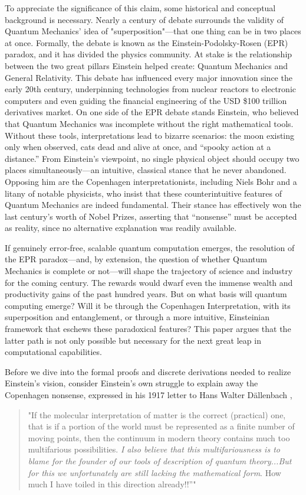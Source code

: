 \documentclass{article}
\begin{document}
To appreciate the significance of this claim, some historical and conceptual background is necessary. Nearly a century of debate surrounds the validity of Quantum Mechanics' idea of "superposition"—that one thing can be in two places at once. Formally, the debate is known as the Einstein-Podolsky-Rosen (EPR)\cite{EPR1935} paradox, and it has divided the physics community. At stake is the relationship between the two great pillars Einstein helped create: Quantum Mechanics and General Relativity. This debate has influenced every major innovation since the early 20th century, underpinning technologies from nuclear reactors to electronic computers and even guiding the financial engineering of the USD \$100 trillion derivatives market. On one side of the EPR debate stands Einstein, who believed that Quantum Mechanics was incomplete without the right mathematical tools. Without these tools, interpretations lead to bizarre scenarios: the moon existing only when observed, cats dead and alive at once, and “spooky action at a distance.” From Einstein’s viewpoint, no single physical object should occupy two places simultaneously—an intuitive, classical stance that he never abandoned. Opposing him are the Copenhagen interpretationists, including Niels Bohr and a litany of notable physicists, who insist that these counterintuitive features of Quantum Mechanics are indeed fundamental. Their stance has effectively won the last century’s worth of Nobel Prizes, asserting that “nonsense” must be accepted as reality, since no alternative explanation was readily available.

If genuinely error-free, scalable quantum computation emerges, the resolution of the EPR paradox—and, by extension, the question of whether Quantum Mechanics is complete or not—will shape the trajectory of science and industry for the coming century. The rewards would dwarf even the immense wealth and productivity gains of the past hundred years. But on what basis will quantum computing emerge? Will it be through the Copenhagen Interpretation, with its superposition and entanglement, or through a more intuitive, Einsteinian framework that eschews these paradoxical features? This paper argues that the latter path is not only possible but necessary for the next great leap in computational capabilities.

Before we dive into the formal proofs and discrete derivations needed to realize Einstein’s vision, consider Einstein’s own struggle to explain away the Copenhagen nonsense, expressed in his 1917 letter to Hans Walter Dällenbach \cite{Einstein314},
\begin{quote}
    "If the molecular interpretation of matter is the correct (practical) one, that is if a portion of the world must be represented as a finite number of moving points, then the continuum in modern theory contains much too multifarious possibilities. \textit{I also believe that this multifariousness is to blame for the founder of our tools of description of quantum theory...But for this we unfortunately are still lacking the mathematical form}. How much I have toiled in this direction already!!”"
\end{quote}
\end{document}
